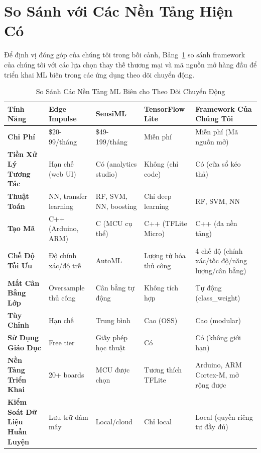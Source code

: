 \section{So Sánh với Các Nền Tảng Hiện Có}

Để định vị đóng góp của chúng tôi trong bối cảnh, Bảng~\ref{tab:platform_comparison} so sánh framework của chúng tôi với các lựa chọn thay thế thương mại và mã nguồn mở hàng đầu để triển khai ML biên trong các ứng dụng theo dõi chuyển động.

\begin{table}[H]
\centering
\caption{So Sánh Các Nền Tảng ML Biên cho Theo Dõi Chuyển Động}
\label{tab:platform_comparison}
\small
\begin{tabular}{@{}p{2.8cm}p{2.2cm}p{2.2cm}p{2.2cm}p{2.2cm}@{}}
\toprule
\textbf{Tính Năng} & \textbf{Edge Impulse} & \textbf{SensiML} & \textbf{TensorFlow Lite} & \textbf{Framework Của Chúng Tôi} \\
\midrule
\textbf{Chi Phí} & \$20-99/tháng & \$49-199/tháng & Miễn phí & Miễn phí (Mã nguồn mở) \\
\midrule
\textbf{Tiền Xử Lý Tương Tác} & Hạn chế (web UI) & Có (analytics studio) & Không (chỉ code) & Có (cửa sổ kéo thả) \\
\midrule
\textbf{Thuật Toán} & NN, transfer learning & RF, SVM, NN, boosting & Chỉ deep learning & RF, SVM, NN \\
\midrule
\textbf{Tạo Mã} & C++ (Arduino, ARM) & C (MCU cụ thể) & C++ (TFLite Micro) & C++ (đa nền tảng) \\
\midrule
\textbf{Chế Độ Tối Ưu} & Độ chính xác/độ trễ & AutoML & Lượng tử hóa thủ công & 4 chế độ (chính xác/tốc độ/năng lượng/cân bằng) \\
\midrule
\textbf{Mất Cân Bằng Lớp} & Oversample thủ công & Cân bằng tự động & Không tích hợp & Tự động (class\_weight) \\
\midrule
\textbf{Tùy Chỉnh} & Hạn chế & Trung bình & Cao (OSS) & Cao (modular) \\
\midrule
\textbf{Sử Dụng Giáo Dục} & Free tier & Giấy phép học thuật & Có & Có (không giới hạn) \\
\midrule
\textbf{Nền Tảng Triển Khai} & 20+ boards & MCU được chọn & Tương thích TFLite & Arduino, ARM Cortex-M, mở rộng được \\
\midrule
\textbf{Kiểm Soát Dữ Liệu Huấn Luyện} & Lưu trữ đám mây & Local/cloud & Chỉ local & Local (quyền riêng tư đầy đủ) \\
\bottomrule
\end{tabular}
\end{table}

